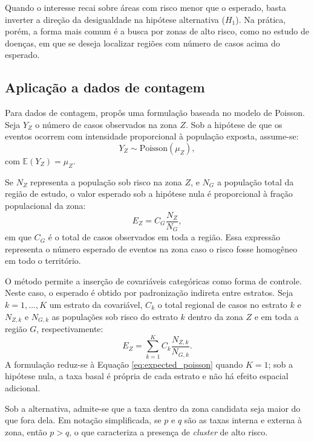 Quando o interesse recai sobre áreas com risco menor que o esperado, basta inverter a direção da desigualdade na hipótese alternativa ($H_1$). Na prática, porém, a forma mais comum é a busca por zonas de alto risco, como no estudo de doenças, em que se deseja localizar regiões com número de casos acima do esperado.

\subsection{Aplicação a dados de contagem}

Para dados de contagem,  propôs uma formulação baseada no modelo de Poisson. Seja \(Y_Z\) o número de casos observados na zona \(Z\). Sob a hipótese de que os eventos ocorrem com intensidade proporcional à população exposta, assume-se:
\begin{equation}
Y_Z \sim \mathrm{Poisson}(\mu_Z),
\label{eq:poisson_model}
\end{equation}
com \(\mathbb{E}(Y_Z)=\mu_Z\).

Se \(N_Z\) representa a população sob risco na zona \(Z\), e \(N_G\) a população total da região de estudo, o valor esperado sob a hipótese nula é proporcional à fração populacional da zona:
\begin{equation}
E_Z = C_G \frac{N_Z}{N_G},
\label{eq:expected_poisson}
\end{equation}
em que \(C_G\) é o total de casos observados em toda a região. Essa expressão representa o número esperado de eventos na zona caso o risco fosse homogêneo em todo o território.

O método permite a inserção de covariáveis categóricas como forma de controle. Neste caso, o esperado é obtido por padronização indireta entre estratos. Seja \(k = 1, \ldots, K\) um estrato da covariável, \(C_k\) o total regional de casos no estrato \(k\) e \(N_{Z,k}\) e \(N_{G,k}\) as populações sob risco do estrato \(k\) dentro da zona \(Z\) e em toda a região \(G\), respectivamente:
\begin{equation}
E_Z=\sum_{k=1}^{K}C_k\frac{N_{Z,k}}{N_{G,k}}.
\label{eq:expected_covariate}
\end{equation}
A formulação reduz-se à Equação \eqref{eq:expected_poisson} quando \(K = 1\); sob a hipótese nula, a taxa basal é própria de cada estrato e não há efeito espacial adicional.

Sob a alternativa, admite-se que a taxa dentro da zona candidata seja maior do que fora dela. Em notação simplificada, se \(p\) e \(q\) são as taxas interna e externa à zona, então \(p>q\), o que caracteriza a presença de \textit{cluster} de alto risco.

